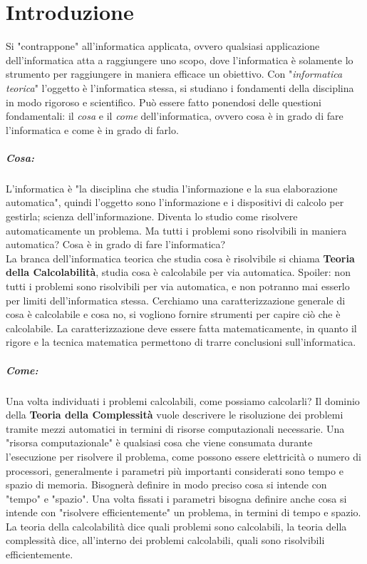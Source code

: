 
\chapter*{Introduzione}

Si "contrappone" all'informatica applicata, ovvero qualsiasi applicazione dell'informatica atta a raggiungere uno scopo, dove l'informatica è solamente lo strumento per raggiungere in maniera efficace un obiettivo. Con "\textit{informatica teorica}" l'oggetto è l'informatica stessa, si studiano i fondamenti della disciplina in modo rigoroso e scientifico. Può essere fatto ponendosi delle questioni fondamentali: il \textit{cosa} e il \textit{come} dell'informatica, ovvero cosa è in grado di fare l'informatica e come è in grado di farlo.

\paragraph{Cosa:} L'informatica è "la disciplina che studia l'informazione e la sua elaborazione automatica", quindi l'oggetto sono l'informazione e i dispositivi di calcolo per gestirla; scienza dell'informazione. Diventa lo studio come risolvere automaticamente un problema. Ma tutti i problemi sono risolvibili in maniera automatica? Cosa è in grado di fare l'informatica? \\

La branca dell'informatica teorica che studia cosa è risolvibile si chiama \textbf{Teoria della Calcolabilità}, studia cosa è calcolabile per via automatica. Spoiler: non tutti i problemi sono risolvibili per via automatica, e non potranno mai esserlo per limiti dell'informatica stessa. Cerchiamo una caratterizzazione generale di cosa è calcolabile e cosa no, si vogliono fornire strumenti per capire ciò che è calcolabile. La caratterizzazione deve essere fatta matematicamente, in quanto il rigore e la tecnica matematica permettono di trarre conclusioni sull'informatica.

\paragraph{Come:} Una volta individuati i problemi calcolabili, come possiamo calcolarli? Il dominio della \textbf{Teoria della Complessità} vuole descrivere le risoluzione dei problemi tramite mezzi automatici in termini di risorse computazionali necessarie. Una "risorsa computazionale" è qualsiasi cosa che viene consumata durante l'esecuzione per risolvere il problema, come possono essere elettricità o numero di processori, generalmente i parametri più importanti considerati sono tempo e spazio di memoria. Bisognerà definire in modo preciso cosa si intende con "tempo" e "spazio". Una volta fissati i parametri bisogna definire anche cosa si intende con "risolvere efficientemente" un problema, in termini di tempo e spazio. La teoria della calcolabilità dice quali problemi sono calcolabili, la teoria della complessità dice, all'interno dei problemi calcolabili, quali sono risolvibili efficientemente.\\

